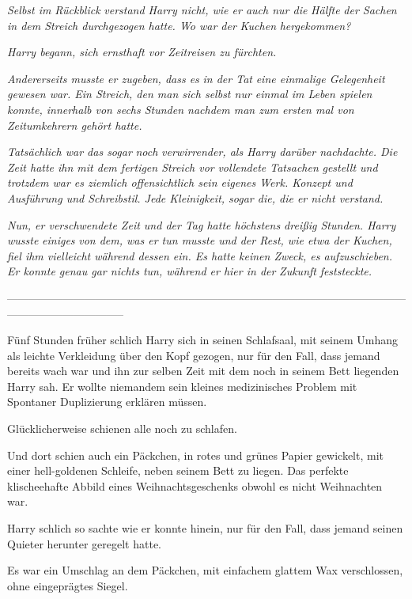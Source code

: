 {\emph{Selbst im} \emph{\emph{Rückblick}} \emph{verstand Harry nicht, wie er auch nur die} \emph{\emph{Hälfte}} \emph{der Sachen in dem Streich durchgezogen hatte. Wo war der} \emph{\emph{Kuchen}} \emph{hergekommen?}

\emph{Harry begann, sich ernsthaft vor Zeitreisen zu fürchten.}

\emph{Andererseits musste er zugeben, dass es} \emph{\emph{in der Tat}} \emph{eine einmalige Gelegenheit gewesen war. Ein Streich, den man sich selbst nur einmal im Leben spielen konnte, innerhalb von sechs Stunden nachdem man zum ersten mal von Zeitumkehrern gehört hatte.}

\emph{Tatsächlich war das sogar} \emph{\emph{noch}} \emph{verwirrender, als Harry darüber nachdachte. Die Zeit hatte ihn mit dem fertigen Streich vor} \emph{\emph{vollendete Tatsachen}} \emph{gestellt und trotzdem war es ziemlich offensichtlich sein eigenes Werk. Konzept und Ausführung und Schreibstil. Jede Kleinigkeit, sogar die, die er nicht verstand.}

\emph{Nun, er verschwendete Zeit und der Tag hatte höchstens dreißig Stunden. Harry wusste} \emph{\emph{einiges}} \emph{von dem, was er tun musste und der Rest, wie etwa der Kuchen, fiel ihm vielleicht während dessen ein. Es hatte keinen Zweck, es aufzuschieben. Er konnte genau gar nichts tun, während er hier in der} \emph{\emph{Zukunft}} \emph{feststeckte.}

--------------------------------------------------------------------------------------------------------------------------------------------

\hfill\break Fünf Stunden früher schlich Harry sich in seinen Schlafsaal, mit seinem Umhang als leichte Verkleidung über den Kopf gezogen, nur für den Fall, dass jemand bereits wach war und ihn zur selben Zeit mit dem noch in seinem Bett liegenden Harry sah. Er wollte niemandem sein kleines medizinisches Problem mit Spontaner Duplizierung erklären müssen.

Glücklicherweise schienen alle noch zu schlafen.

Und dort schien auch ein Päckchen, in rotes und grünes Papier gewickelt, mit einer hell-goldenen Schleife, neben seinem Bett zu liegen. Das perfekte klischeehafte Abbild eines Weihnachtsgeschenks obwohl es nicht Weihnachten war.

Harry schlich so sachte wie er konnte hinein, nur für den Fall, dass jemand seinen Quieter herunter geregelt hatte.

Es war ein Umschlag an dem Päckchen, mit einfachem glattem Wax verschlossen, ohne eingeprägtes Siegel.

}
